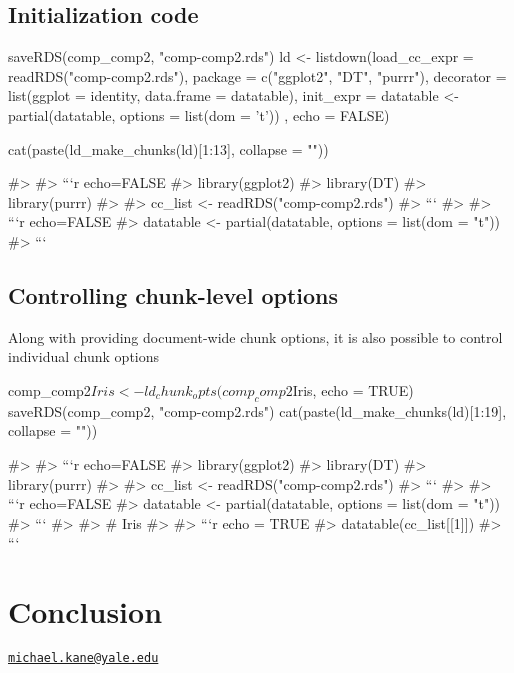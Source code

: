 \hypertarget{initialization-code}{%
\subsection{Initialization code}\label{initialization-code}}

\begin{Schunk}
\begin{Sinput}
saveRDS(comp_comp2, "comp-comp2.rds")
ld <- listdown(load_cc_expr = readRDS("comp-comp2.rds"),
               package = c("ggplot2", "DT", "purrr"),
               decorator = list(ggplot = identity,
                                data.frame = datatable),
               init_expr = {
                 datatable <- partial(datatable,
                                      options = list(dom = 't'))
                 },
               echo = FALSE)

cat(paste(ld_make_chunks(ld)[1:13], collapse = "\n"))
\end{Sinput}
\begin{Soutput}
#> 
#> ```{r echo=FALSE}
#> library(ggplot2)
#> library(DT)
#> library(purrr)
#> 
#> cc_list <- readRDS("comp-comp2.rds")
#> ```
#> 
#> ```{r echo=FALSE}
#> datatable <- partial(datatable, options = list(dom = "t"))
#> ```
\end{Soutput}
\end{Schunk}

\hypertarget{controlling-chunk-level-options}{%
\subsection{Controlling chunk-level
options}\label{controlling-chunk-level-options}}

Along with providing document-wide chunk options, it is also possible to
control individual chunk options

\begin{Schunk}
\begin{Sinput}
comp_comp2$Iris <- ld_chunk_opts(comp_comp2$Iris, echo = TRUE)
saveRDS(comp_comp2, "comp-comp2.rds")
cat(paste(ld_make_chunks(ld)[1:19], collapse = "\n"))
\end{Sinput}
\begin{Soutput}
#> 
#> ```{r echo=FALSE}
#> library(ggplot2)
#> library(DT)
#> library(purrr)
#> 
#> cc_list <- readRDS("comp-comp2.rds")
#> ```
#> 
#> ```{r echo=FALSE}
#> datatable <- partial(datatable, options = list(dom = "t"))
#> ```
#> 
#> # Iris
#> 
#> ```{r echo = TRUE}
#> datatable(cc_list[[1]])
#> ```
\end{Soutput}
\end{Schunk}

\hypertarget{conclusion}{%
\section{Conclusion}\label{conclusion}}




\address{%
Michael Kane\\
Yale University\\
60 College Street\\ New Haven, CT 06510, USA\\
}
\href{mailto:michael.kane@yale.edu}{\nolinkurl{michael.kane@yale.edu}}
